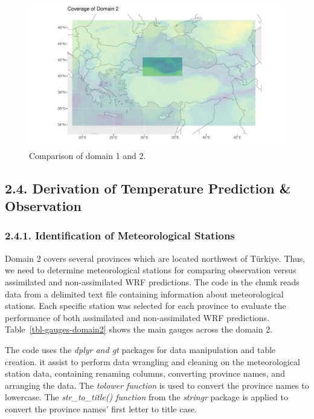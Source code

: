 \documentclass[
  letterpaper,
  DIV=11,
  numbers=noendperiod,
  abstract]{scrartcl}
\begin{document}
\begin{figure}[H]

{\centering \includegraphics{WRF_pdf_files/figure-pdf/fig-domain2-1.pdf}

}

\caption{\label{fig-domain2}Comparison of domain 1 and 2.}

\end{figure}

\hypertarget{derivation-of-temperature-prediction-observation}{%
\subsection{2.4. Derivation of Temperature Prediction \&
Observation}\label{derivation-of-temperature-prediction-observation}}

\hypertarget{identification-of-meteorological-stations}{%
\subsubsection{2.4.1. Identification of Meteorological
Stations}\label{identification-of-meteorological-stations}}

Domain 2 covers several provinces which are located northwest of
Türkiye. Thus, we need to determine meteorological stations for
comparing observation versus assimilated and non-assimilated WRF
predictions. The code in the chunk reads data from a delimited text file
containing information about meteorological stations. Each specific
station was selected for each province to evaluate the performance of
both assimilated and non-assimilated WRF predictions.
Table~\ref{tbl-gauges-domain2} shows the main gauges across the domain
2.

The code uses the \emph{dplyr and gt} packages for data manipulation and
table creation. it assist to perform data wrangling and cleaning on the
meteorological station data, containing renaming columns, converting
province names, and arranging the data. The \emph{tolower function} is
used to convert the province names to lowercase. The
\emph{str\_to\_title() function} from the \emph{stringr} package is
applied to convert the province names' first letter to title case.
\end{document}

